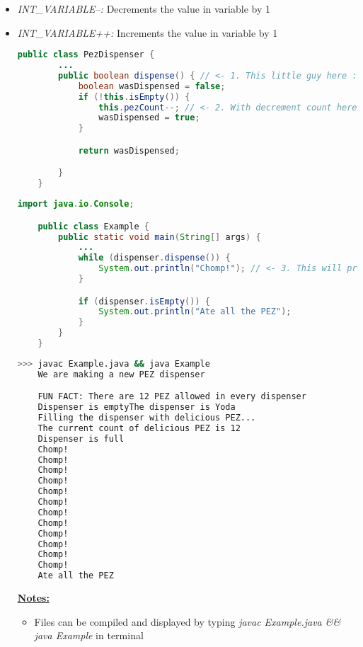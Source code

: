 \documentclass[12pt]{article}
\begin{document}
\begin{itemize}
    \item \textit{INT\_VARIABLE--:} Decrements the value in variable by 1
    \item \textit{INT\_VARIABLE++:} Increments the value in variable by 1

    \bigskip

    \begin{lstlisting}[language=Java,caption={lesson\_7/PezDispenser.java}]
    public class PezDispenser {
        ...
        public boolean dispense() { // <- 1. This little guy here :)
            boolean wasDispensed = false;
            if (!this.isEmpty()) {
                this.pezCount--; // <- 2. With decrement count here
                wasDispensed = true;
            }

            return wasDispensed;

        }
    }
    \end{lstlisting}

    \bigskip

    \begin{lstlisting}[language=Java,caption={lesson\_7/Example.java}]
    import java.io.Console;

    public class Example {
        public static void main(String[] args) {
            ...
            while (dispenser.dispense()) {
                System.out.println("Chomp!"); // <- 3. This will print as long as .dispensed() returns true
            }

            if (dispenser.isEmpty()) {
                System.out.println("Ate all the PEZ");
            }
        }
    }
    \end{lstlisting}

    \bigskip

    \begin{lstlisting}[language=bash]
    >>> javac Example.java && java Example
    We are making a new PEZ dispenser

    FUN FACT: There are 12 PEZ allowed in every dispenser
    Dispenser is emptyThe dispenser is Yoda
    Filling the dispenser with delicious PEZ...
    The current count of delicious PEZ is 12
    Dispenser is full
    Chomp!
    Chomp!
    Chomp!
    Chomp!
    Chomp!
    Chomp!
    Chomp!
    Chomp!
    Chomp!
    Chomp!
    Chomp!
    Chomp!
    Ate all the PEZ
    \end{lstlisting}

    \underline{\textbf{Notes:}}

    \bigskip

    \begin{itemize}
        \item Files can be compiled and displayed by typing \textit{javac Example.java \&\& java Example}
        in terminal
    \end{itemize}
\end{itemize}
\end{document}
